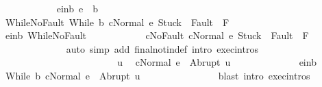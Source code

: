 \begin{isabellebody}
\ \ \ \ \ \ \ \ \ \ \isamarkupfalse%
\ e{\isacharunderscore}in{\isacharunderscore}b{\isacharcolon}\ {\isachardoublequoteopen}e\ {\isasymin}\ b{\isachardoublequoteclose}\isanewline
\ \ \ \ \ \ \ \ \ \ \isamarkupfalse%
\ WhileNoFault{\isacharcolon}\ {\isachardoublequoteopen}{\isasymGamma}{\isasymturnstile}{\isasymlangle}While\ b\ c{\isacharcomma}Normal\ e{\isasymrangle}\ {\isasymRightarrow}{\isasymnotin}{\isacharparenleft}{\isacharbraceleft}Stuck{\isacharbraceright}\ {\isasymunion}\ Fault\ {\isacharbackquote}\ {\isacharparenleft}{\isacharminus}F{\isacharparenright}{\isacharparenright}{\isachardoublequoteclose}\isanewline
\ \ \ \ \ \ \ \ \ \ \isamarkupfalse%
\ e{\isacharunderscore}in{\isacharunderscore}b\ WhileNoFault\isanewline
\ \ \ \ \ \ \ \ \ \ \isamarkupfalse%
\ cNoFault{\isacharcolon}\ {\isachardoublequoteopen}{\isasymGamma}{\isasymturnstile}{\isasymlangle}c{\isacharcomma}Normal\ e{\isasymrangle}\ {\isasymRightarrow}{\isasymnotin}{\isacharparenleft}{\isacharbraceleft}Stuck{\isacharbraceright}\ {\isasymunion}\ Fault\ {\isacharbackquote}\ {\isacharparenleft}{\isacharminus}F{\isacharparenright}{\isacharparenright}{\isachardoublequoteclose}\isanewline
\ \ \ \ \ \ \ \ \ \ \ \ \isamarkupfalse%
\ {\isacharparenleft}auto\ simp\ add{\isacharcolon}\ final{\isacharunderscore}notin{\isacharunderscore}def\ intro{\isacharcolon}\ exec{\isachardot}intros{\isacharparenright}\isanewline
\ \ \ \ \ \ \ \ \ \ \isamarkupfalse%
\isanewline
\ \ \ \ \ \ \ \ \ \ \isacommand{{\isacharbraceleft}}\isamarkupfalse%
\isanewline
\ \ \ \ \ \ \ \ \ \ \ \ \isamarkupfalse%
\ u\ \isamarkupfalse%
\ {\isachardoublequoteopen}{\isasymGamma}{\isasymturnstile}{\isasymlangle}c{\isacharcomma}Normal\ e{\isasymrangle}\ {\isasymRightarrow}\ Abrupt\ u{\isachardoublequoteclose}\isanewline
\ \ \ \ \ \ \ \ \ \ \ \ \isamarkupfalse%
\ e{\isacharunderscore}in{\isacharunderscore}b\ \isamarkupfalse%
\ {\isachardoublequoteopen}{\isasymGamma}{\isasymturnstile}{\isasymlangle}While\ b\ c{\isacharcomma}Normal\ e{\isasymrangle}\ {\isasymRightarrow}\ Abrupt\ u{\isachardoublequoteclose}\isanewline
\ \ \ \ \ \ \ \ \ \ \ \ \ \ \isamarkupfalse%
\ {\isacharparenleft}blast\ intro{\isacharcolon}\ exec{\isachardot}intros{\isacharparenright}\isanewline
\ \ \ \ \ \ \ \ \ \ \isacommand{{\isacharbraceright}}\isamarkupfalse%
\isanewline
\ \ \ \ \ \ \ \ \ \ \isamarkupfalse%
\isanewline
\ \ \ \ \ \ \ \ \ \ \isamarkupfalse%

\end{isabellebody}
